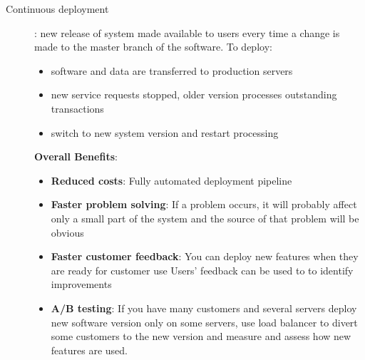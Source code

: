 \begin{description}
   \item[Continuous deployment]: new release of system made available to users every time a change is made to the master branch of the software.
         To deploy:
         \begin{itemize}
            \item software and data are transferred to production servers
            \item  new service requests stopped, older version processes outstanding transactions
            \item switch to new system version and restart processing
         \end{itemize}
         \textbf{Overall Benefits}:
         \begin{itemize}
            \item \textbf{Reduced costs}: Fully automated deployment pipeline
            \item \textbf{Faster problem solving}: If a problem occurs, it will probably affect only a small part of the system and the source of that problem will be obvious
            \item \textbf{Faster customer feedback}: You can deploy new features when they are ready for customer use Users’ feedback can be used to to identify improvements
            \item \textbf{A/B testing}: If you have many customers and several servers deploy new software version only on some servers, use load balancer to divert some customers to the new version and measure and assess how new features are used.
         \end{itemize}


\end{description}
